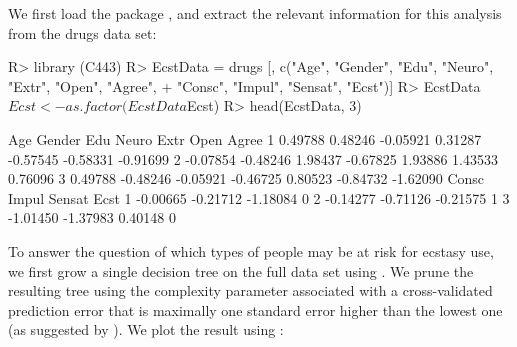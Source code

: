 We first load the package , and extract the relevant information for this analysis from the drugs data set: 

\begin{example}

R> library (C443)
R> EcstData = drugs [, c("Age", "Gender", "Edu", "Neuro", "Extr", "Open", "Agree",
+    "Consc", "Impul", "Sensat", "Ecst")] 
R> EcstData$Ecst <- as.factor(EcstData$Ecst) 
R> head(EcstData, 3)


       Age   Gender      Edu    Neuro     Extr     Open    Agree
1  0.49788  0.48246 -0.05921  0.31287 -0.57545 -0.58331 -0.91699
2 -0.07854 -0.48246  1.98437 -0.67825  1.93886  1.43533  0.76096
3  0.49788 -0.48246 -0.05921 -0.46725  0.80523 -0.84732 -1.62090
     Consc    Impul   Sensat Ecst
1 -0.00665 -0.21712 -1.18084    0
2 -0.14277 -0.71126 -0.21575    1
3 -1.01450 -1.37983  0.40148    0

\end{example}
To answer the question of which types of people may be at risk for ecstasy use, we first grow a single decision tree on the full data set using . We prune the resulting tree using the complexity parameter associated with a cross-validated prediction error that is maximally one standard error higher than the lowest one (as suggested by \citet{Hastie2009}). We plot the result using :

